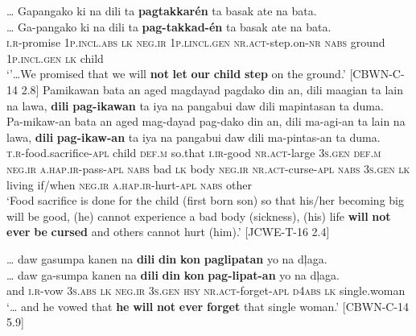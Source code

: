 \newpage

\ea
\label{bkm:Ref118464902}
… Gapangako  ki  na  dili  ta  \textbf{pagtakkarén} ta  basak ate  na  bata. \\\smallskip
\gll … Ga-pangako  ki  na  dili  ta  \textbf{pag-takkad-én} ta  basak ate  na  bata. \\
{} \textsc{i.r}-promise  1\textsc{p.incl.abs}  \textsc{lk}  \textsc{neg.ir}  1\textsc{p.lincl.gen}  \textsc{nr.act}-step.on-\textsc{nr}
\textsc{nabs}  ground 1\textsc{p.incl.gen}  \textsc{lk}  child \\
\glt `’…We promised that we will \textbf{not} \textbf{let} \textbf{our} \textbf{child} \textbf{step} on the ground.’ [CBWN-C-14 2.8]
\z
\ea
Pamikawan  bata  an  aged  magdayad  pagdako  din  an, dili  maagian  ta  lain  na  lawa,  \textbf{dili}  \textbf{pag-ikawan} ta  iya  na  pangabui  daw  dili  mapintasan  ta  duma. \\\smallskip
\gll Pa-mikaw-an  bata  an  aged  mag-dayad  pag-dako  din  an, dili  ma-agi-an  ta  lain  na  lawa,  \textbf{dili}  \textbf{pag-ikaw-an} ta  iya  na  pangabui  daw  dili  ma-pintas-an  ta  duma. \\
\textsc{t.r}-food.sacrifice-\textsc{apl}  child  \textsc{def.m}  so.that  \textsc{i.ir}-good  \textsc{nr.act}-large  3\textsc{s.gen}  \textsc{def.m}
\textsc{neg.ir}  \textsc{a.hap.ir}-pass-\textsc{apl}  \textsc{nabs}  bad  \textsc{lk}  body  \textsc{neg.ir}  \textsc{nr.act}-curse-\textsc{apl}
\textsc{nabs}  3\textsc{s.gen}  \textsc{lk}  living  if/when  \textsc{neg.ir}  \textsc{a.hap.ir}-hurt-\textsc{apl}  \textsc{nabs}  other \\
\glt `Food sacrifice is done for the child (first born son) so that his/her becoming big will be good, (he) cannot experience a bad body (sickness), (his) life \textbf{will} \textbf{not} \textbf{ever} \textbf{be} \textbf{cursed} and others cannot hurt (him).’ [JCWE-T-16 2.4]
\z

\ea
… daw  gasumpa  kanen  na  \textbf{dili}  \textbf{din}  \textbf{kon}  \textbf{paglipatan}  yo na  dļaga. \\\smallskip
\gll … daw  ga-sumpa  kanen  na  \textbf{dili}  \textbf{din}  \textbf{kon}  \textbf{pag-lipat-an}  yo na  dļaga. \\
{} and  \textsc{i.r}-vow  3\textsc{s.abs}  \textsc{lk}  \textsc{neg.ir}  3\textsc{s.gen}  \textsc{hsy}  \textsc{nr.act}-forget-\textsc{apl}  \textsc{d4abs}
\textsc{lk}  single.woman \\
\glt `… and he vowed that \textbf{he} \textbf{will} \textbf{not} \textbf{ever} \textbf{forget} that single woman.’ [CBWN-C-14 5.9]
\z

